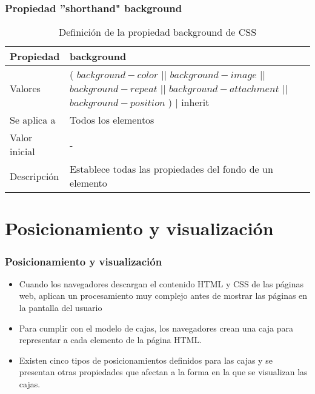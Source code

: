 
\begin{frame}
\frametitle{Propiedad ''shorthand" background}

\begin{center}
  \begin{table}
   \begin{tabular}{p{1.8cm}p{7.8cm}}
Propiedad & \bf{background} \\ \hline
Valores& ( $background-color$ || $background-image$ || $background-repeat$ || $background-attachment$ || $background-position$ ) | inherit \\ \hline
Se aplica a& Todos los elementos \\ \hline
Valor inicial& - \\ \hline
Descripción& Establece todas las propiedades del fondo de un elemento \\ \hline
  \end{tabular}
   \caption{Definición de la propiedad background de CSS}
 \end{table}
\end{center}


\end{frame}



\section{Posicionamiento y visualización}

\begin{frame}
\frametitle{Posicionamiento y visualización}

\begin{itemize}
  \item Cuando los navegadores descargan el contenido HTML y CSS de las páginas web, aplican un procesamiento muy complejo antes de mostrar las páginas en la pantalla del usuario
  \item Para cumplir con el modelo de cajas, los navegadores crean una caja para representar a cada elemento de la página HTML.
  \item Existen cinco tipos de posicionamientos definidos para las cajas y se presentan otras propiedades que afectan a la forma en la que se visualizan las cajas.
\end{itemize}

\end{frame}


